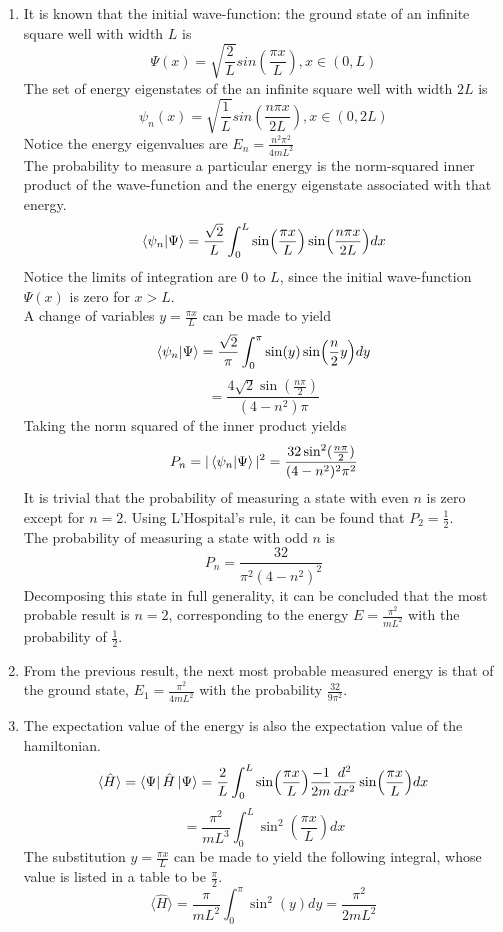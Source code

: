 \begin{sol}
\begin{enumerate}[label=\textbf{(\alph*)}]
\item
It is known that the initial wave-function: the ground state of an infinite square well with width $L$ is 
$$\Psi(x)=\sqrt{\frac{2}{L}}sin(\frac{\pi x}{L}),x\in(0,L)$$
The set of energy eigenstates of the an infinite square well with width $2L$ is
$$\psi_n(x)=\sqrt{\frac{1}{L}}sin(\frac{n\pi x}{2L}),x\in(0,2L)$$
Notice the energy eigenvalues are $\displaystyle{E_n=\frac{n^2\pi^2}{4mL^2}}$\\
The probability to measure a particular energy is the norm-squared inner product of the wave-function and the energy eigenstate associated with that energy. 
$$\braket{\psi_n}{\Psi}=\frac{\sqrt 2}{L}\int_0^{L}\sin(\frac{\pi x}{L})\sin(\frac{n\pi x}{2L})dx$$ 
Notice the limits of integration are $0$ to $L$, since the initial wave-function $\Psi(x)$ is zero for $x>L$.\\
A change of variables $y=\frac{\pi x}{L}$ can be made to yield
$$\braket{\psi_n}{\Psi}=\frac{\sqrt 2}{\pi}\int_0^{\pi}\sin(y)\sin(\frac{n}{2}y)dy$$
$$=\frac{4\sqrt 2 \sin(\frac{n\pi}{2})}{(4-n^2)\pi}$$
Taking the norm squared of the inner product yields
$$P_n=|\braket{\psi_n}{\Psi}|^2=\frac{32\sin^2(\frac{n\pi}{2})}{(4-n^2)^2\pi^2}$$
It is trivial that the probability of measuring a state with even $n$ is zero except for $n=2$. Using L'Hospital's rule, it can be found that $P_2=\frac{1}{2}$.\\

The probability of measuring a state with odd $n$ is
$$P_n=\frac{32}{\pi^2(4-n^2)^2}$$ 
Decomposing this state in full generality, it can be concluded that the most probable result is $n=2$, corresponding to the energy $\displaystyle{E=\frac{\pi^2}{mL^2}}$ with the probability of $\displaystyle{\frac{1}{2}}$.
\item
From the previous result, the next most probable measured energy is that of the ground state, $\displaystyle{E_1=\frac{\pi^2}{4mL^2}}$ with the probability $\displaystyle{\frac{32}{9\pi^2}}$.
\item
The expectation value of the energy is also the expectation value of the hamiltonian.
$$\langle\hat{H}\rangle=\bra{\Psi}\hat{H}\ket{\Psi}=\frac{2}{L}\int_0^L\sin(\frac{\pi x}{L})\frac{-1}{2m}\frac{d^2}{dx^2}\sin(\frac{\pi x}{L})dx$$ $$=\frac{\pi^2}{mL^3}\int_0^L\sin^2(\frac{\pi x}{L})dx$$
The substitution $y=\frac{\pi x}{L}$ can be made to yield the following integral, whose value is listed in a table to be $\frac{\pi}{2}$.
$$\langle\hat{H}\rangle=\frac{\pi}{mL^2}\int_0^\pi\sin^2(y)dy=\frac{\pi^2}{2mL^2}$$

\end{enumerate}
\end{sol}